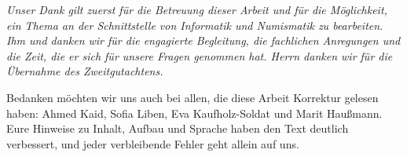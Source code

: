 
\bigskip

\begingroup
\let\clearpage\relax
\let\cleardoublepage\relax
\let\cleardoublepage\relax


%
%
%
%


\begin{vplace}[0.618]
{\slshape
Unser Dank gilt zuerst \myProf für die Betreuung dieser Arbeit und für die Möglichkeit, ein Thema an der Schnittstelle von Informatik und Numismatik zu bearbeiten. Ihm und \mySupervisor danken wir für die engagierte Begleitung, die fachlichen Anregungen und die Zeit, die er sich für unsere Fragen genommen hat. Herrn \myOtherProf danken wir für die Übernahme des Zweitgutachtens.

\bigskip

Bedanken möchten wir uns auch bei allen, die diese Arbeit Korrektur gelesen haben: Ahmed Kaid, Sofia Liben, Eva Kaufholz-Soldat und Marit Haußmann. Eure Hinweise zu Inhalt, Aufbau und Sprache haben den Text deutlich verbessert, und jeder verbleibende Fehler geht allein auf uns.
}
\end{vplace}

\endgroup
